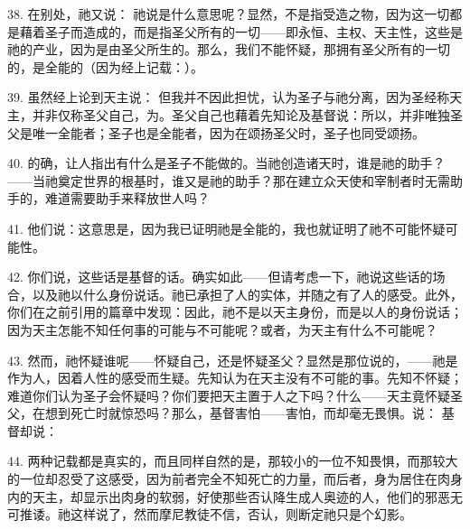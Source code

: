 38. 在别处，祂又说： 祂说是什么意思呢？显然，不是指受造之物，因为这一切都是藉着圣子而造成的，而是指圣父所有的一切——即永恒、主权、天主性，这些是祂的产业，因为是由圣父所生的。那么，我们不能怀疑，那拥有圣父所有的一切的，是全能的（因为经上记载：）。\par

\par

39. 虽然经上论到天主说： 但我并不因此担忧，认为圣子与祂分离，因为圣经称天主，并非仅称圣父自己，为。圣父自己也藉着先知论及基督说：所以，并非唯独圣父是唯一全能者；圣子也是全能者，因为在颂扬圣父时，圣子也同受颂扬。\par

40. 的确，让人指出有什么是圣子不能做的。当祂创造诸天时，谁是祂的助手？——当祂奠定世界的根基时，谁又是祂的助手？那在建立众天使和宰制者时无需助手的，难道需要助手来释放世人吗？\par

41. 他们说：这意思是，因为我已证明祂是全能的，我也就证明了祂不可能怀疑可能性。\par

42. 你们说，这些话是基督的话。确实如此——但请考虑一下，祂说这些话的场合，以及祂以什么身份说话。祂已承担了人的实体，并随之有了人的感受。此外，你们在之前引用的篇章中发现：因此，祂不是以天主身份，而是以人的身份说话；因为天主怎能不知任何事的可能与不可能呢？或者，为天主有什么不可能呢？\par

43. 然而，祂怀疑谁呢——怀疑自己，还是怀疑圣父？显然是那位说的，——祂是作为人，因着人性的感受而生疑。先知认为在天主没有不可能的事。先知不怀疑；难道你们认为圣子会怀疑吗？你们要把天主置于人之下吗？什么——天主竟怀疑圣父，在想到死亡时就惊恐吗？那么，基督害怕——害怕，而却毫无畏惧。说： 基督却说：\par

44. 两种记载都是真实的，而且同样自然的是，那较小的一位不知畏惧，而那较大的一位却忍受了这感受，因为前者完全不知死亡的力量，而后者，身为居住在肉身内的天主，却显示出肉身的软弱，好使那些否认降生成人奥迹的人，他们的邪恶无可推诿。祂这样说了，然而摩尼教徒不信，否认，则断定祂只是个幻影。\par

